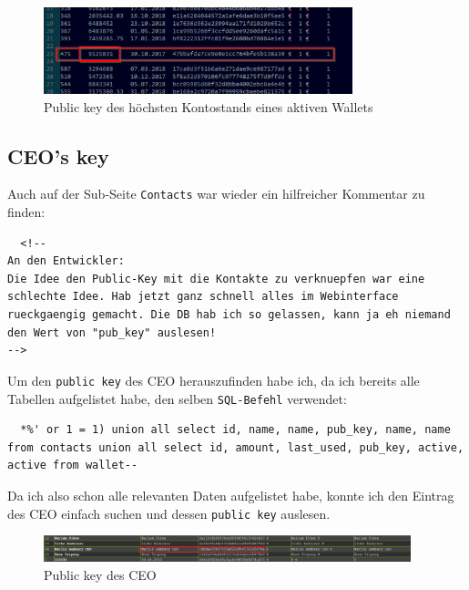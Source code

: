 \documentclass[12pt,a4paper,titlepage,oneside]{scrartcl}
\begin{document}
\begin{figure}[h!]
  \centering
  \includegraphics[width=0.8\textwidth]{./imgs/manager9000/wallet_pub_key.png}
\caption{Public key des höchsten Kontostands eines aktiven Wallets}
\label{fig:wallet_pub_key}
\end{figure}

\subsection{CEO's key}

Auch auf der Sub-Seite \lstinline{Contacts} war wieder ein hilfreicher Kommentar zu finden:

\begin{lstlisting}
  <!--
An den Entwickler:
Die Idee den Public-Key mit die Kontakte zu verknuepfen war eine schlechte Idee. Hab jetzt ganz schnell alles im Webinterface rueckgaengig gemacht. Die DB hab ich so gelassen, kann ja eh niemand den Wert von "pub_key" auslesen!
-->
\end{lstlisting}

Um den \lstinline{public key} des CEO herauszufinden habe ich, da ich bereits alle Tabellen aufgelistet habe, den selben \lstinline{SQL-Befehl} verwendet:

\begin{lstlisting}
  *%' or 1 = 1) union all select id, name, name, pub_key, name, name from contacts union all select id, amount, last_used, pub_key, active, active from wallet--
\end{lstlisting}

Da ich also schon alle relevanten Daten aufgelistet habe, konnte ich den Eintrag des CEO einfach suchen und dessen \lstinline{public key} auslesen.

\begin{figure}[h!]
  \centering
  \includegraphics[width=0.95\textwidth]{./imgs/manager9000/ceo_pub_key.png}
\caption{Public key des CEO}
\label{fig:ceo_pub_key}
\end{figure}
\end{document}
